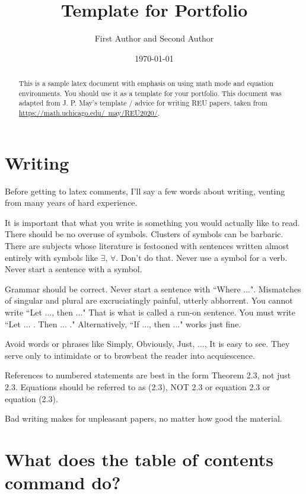 \documentclass[psamsfonts]{amsart}
\title{Template for Portfolio}
\author{First Author and Second Author}
\date{\today}
\theoremstyle{definition}
\theoremstyle{remark}
\numberwithin{equation}{section}
\begin{document}
\begin{abstract}

This is a sample latex document with emphasis on using math mode and
equation environments.  You should use it as a template for your portfolio.
This document was adapted from J. P. May's template / advice for writing REU papers, taken from \href{https://math.uchicago.edu/~may/REU2020/}{https://math.uchicago.edu/~may/REU2020/}.



\end{abstract}

\maketitle

\tableofcontents
\section{Writing}  Before getting to latex comments, I'll say a few words about writing, venting from many years of hard experience. 

It is important that what you write is something you would actually like to read.  There should be no overuse of symbols.
Clusters of symbols can be barbaric.  There are subjects whose literature is festooned with sentences written almost entirely with symbols like $\exists$, $\forall$.  Don't do that. Never use a symbol for a verb.  Never start a sentence with a symbol.  

Grammar should be correct.  Never start a sentence with ``Where ...".   
Mismatches of singular and plural are excruciatingly painful, utterly abhorrent.  You cannot write
``Let ..., then ..."  That is what is called a run-on sentence. You must write ``Let ... .  Then ... ."
Alternatively, ``If ..., then ..."  works just fine.

Avoid words or phrases like Simply, Obviously, Just, ..., It is easy to see.  They serve only to intimidate or to browbeat the reader into acquiescence. 


References to numbered statements are best in the form Theorem 2.3, not just 2.3.
Equations should be referred to as (2.3), NOT 2.3 or equation 2.3 or equation (2.3).


Bad writing makes for unpleasant papers, no matter how good the material.


\section{What does the table of contents command do?}
\end{document}
